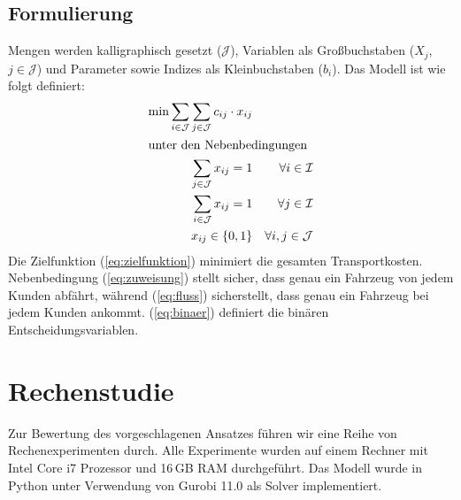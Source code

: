\documentclass[11pt,a4paper]{article}
\begin{document}
\subsection{Formulierung}
\label{sec:formulierung}
Mengen werden kalligraphisch gesetzt ($\mathcal{J}$), Variablen als Großbuchstaben ($X_j$, $j \in \mathcal{J}$) und Parameter sowie Indizes als Kleinbuchstaben ($b_i$).
Das Modell ist wie folgt definiert:
\begin{align}
	\label{eq:zielfunktion}
	\min \sum_{i \in \mathcal{J}} \sum_{j \in \mathcal{J}} c_{ij} \cdot x_{ij} & \\
	\intertext{unter den Nebenbedingungen}
	\label{eq:zuweisung}
	\sum_{j \in \mathcal{J}} x_{ij} = 1 && \forall i \in \mathcal{I} \\
	\label{eq:fluss}
	\sum_{i \in \mathcal{J}} x_{ij} = 1 && \forall j \in \mathcal{I} \\
	\label{eq:binaer}
	x_{ij} \in \{0, 1\} && \forall i, j \in \mathcal{J}
\end{align}
Die Zielfunktion (\ref{eq:zielfunktion}) minimiert die gesamten Transportkosten. Nebenbedingung (\ref{eq:zuweisung}) stellt sicher, dass genau ein Fahrzeug von jedem Kunden abfährt, während (\ref{eq:fluss}) sicherstellt, dass genau ein Fahrzeug bei jedem Kunden ankommt. (\ref{eq:binaer}) definiert die binären Entscheidungsvariablen.

\section{Rechenstudie}
\label{sec:rechenstudie}
Zur Bewertung des vorgeschlagenen Ansatzes führen wir eine Reihe von Rechenexperimenten durch. Alle Experimente wurden auf einem Rechner mit Intel Core i7 Prozessor und 16\,GB RAM durchgeführt. Das Modell wurde in Python unter Verwendung von Gurobi 11.0 als Solver implementiert.
\end{document}
